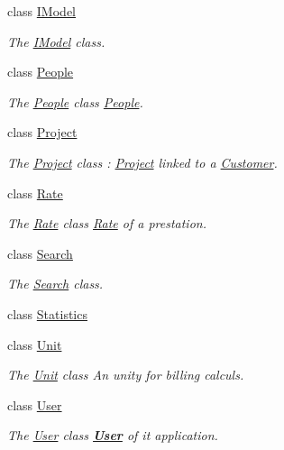 \begin{DoxyCompactItemize}
class \hyperlink{classModels_1_1IModel}{I\+Model}
\begin{DoxyCompactList}\small\item\em The \hyperlink{classModels_1_1IModel}{I\+Model} class. \end{DoxyCompactList}\item 
class \hyperlink{classModels_1_1People}{People}
\begin{DoxyCompactList}\small\item\em The \hyperlink{classModels_1_1People}{People} class \hyperlink{classModels_1_1People}{People}. \end{DoxyCompactList}\item 
class \hyperlink{classModels_1_1Project}{Project}
\begin{DoxyCompactList}\small\item\em The \hyperlink{classModels_1_1Project}{Project} class \+: \hyperlink{classModels_1_1Project}{Project} linked to a \hyperlink{classModels_1_1Customer}{Customer}. \end{DoxyCompactList}\item 
class \hyperlink{classModels_1_1Rate}{Rate}
\begin{DoxyCompactList}\small\item\em The \hyperlink{classModels_1_1Rate}{Rate} class \hyperlink{classModels_1_1Rate}{Rate} of a prestation. \end{DoxyCompactList}\item 
class \hyperlink{classModels_1_1Search}{Search}
\begin{DoxyCompactList}\small\item\em The \hyperlink{classModels_1_1Search}{Search} class. \end{DoxyCompactList}\item 
class \hyperlink{classModels_1_1Statistics}{Statistics}
\item 
class \hyperlink{classModels_1_1Unit}{Unit}
\begin{DoxyCompactList}\small\item\em The \hyperlink{classModels_1_1Unit}{Unit} class An unity for billing calculs. \end{DoxyCompactList}\item 
class \hyperlink{classModels_1_1User}{User}
\begin{DoxyCompactList}\small\item\em The \hyperlink{classModels_1_1User}{User} class {\bfseries \hyperlink{classModels_1_1User}{User}} of it application. \end{DoxyCompactList}\end{DoxyCompactItemize}
